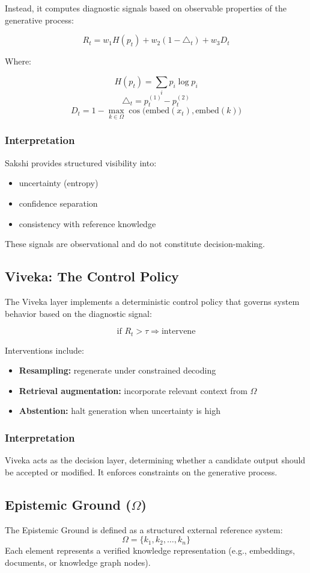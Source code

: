 \documentclass[12pt,a4paper]{article}
\begin{document}
Instead, it computes diagnostic signals based on observable properties of the generative process:

\[
R_t = w_1H(p_t) + w_2(1-\triangle_t) + w_3D_t
\]

Where:

\[
H(p_t) = \sum_{i} p_i \log p_i
\]
\[
\triangle_t=p_t^{(1)}-p_t^{(2)}
\]
\[
D_t = 1 - \max_{k \in \Omega} \cos\big(\text{embed}(x_t), \text{embed}(k)\big)
\]

\subsubsection *{Interpretation}
Sakshi provides structured visibility into:
\begin{itemize}
    \item uncertainty (entropy)
    \item confidence separation
    \item consistency with reference knowledge
\end{itemize}
These signals are observational and do not constitute decision-making.

\subsection{Viveka: The Control Policy}
The Viveka layer implements a deterministic control policy that governs system behavior based on the diagnostic signal:

\[
\text{if } R_t > \tau \Rightarrow \text{intervene}
\]

Interventions include:

\begin{itemize}
\item \textbf{Resampling:} regenerate under constrained decoding
\item \textbf{Retrieval augmentation:} incorporate relevant context from $\Omega$
\item \textbf{Abstention:} halt generation when uncertainty is high
\end{itemize}
\subsubsection *{Interpretation}
Viveka acts as the decision layer, determining whether a candidate output should be accepted or modified. It enforces constraints on the generative process.

\subsection{Epistemic Ground ($\Omega$)}
The Epistemic Ground is defined as a structured external reference system:
\[
\Omega = \{k_1, k_2, \ldots, k_n\}
\]
Each element represents a verified knowledge representation (e.g., embeddings, documents, or knowledge graph nodes).
\end{document}
